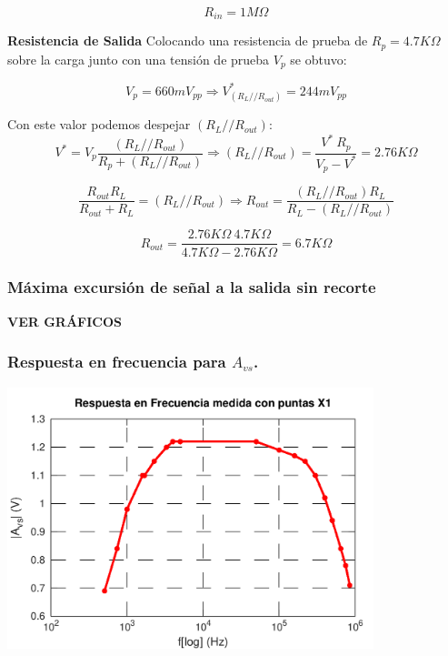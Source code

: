\documentclass[a4paper, 10pt, spanish]{article}
\begin{document}
\begin{equation}
  R_{in}=1M\Omega
\end{equation}

\textbf{Resistencia de Salida}
Colocando una resistencia de prueba de $R_p = 4.7K\Omega$ sobre la carga junto con una tensión de prueba $V_p$ se obtuvo:

\begin{equation}
  V_p= 660mV_{pp} \Rightarrow V^*_{(R_L//R_{out})} = 244 mV_{pp}
\end{equation}

Con este valor podemos despejar $(R_L//R_{out})$:
\begin{equation}
  V^*=V_p \frac{(R_L//R_{out})}{R_p + (R_L//R_{out})} \Rightarrow (R_L//R_{out}) = \frac{V^*\ R_p}{V_p-V^*} = 2.76K\Omega
\end{equation}

\begin{equation}
  \frac{R_{out}R_L}{R_{out}+R_L} = (R_L//R_{out})  \Rightarrow R_{out}=\frac{(R_L//R_{out}) R_L}{R_L - (R_L//R_{out})}
\end{equation}

\begin{equation}
  R_{out}=\frac{2.76K\Omega\ 4.7K\Omega}{4.7K\Omega - 2.76K\Omega}=6.7K\Omega
\end{equation}

\subsubsection{Máxima excursión de señal a la salida sin recorte}

\textbf{VER GRÁFICOS}

\subsubsection{Respuesta en frecuencia para $A_{vs}$.}

\begin{center}
  \includegraphics[width=0.8\textwidth]{X1.png}
  \label{fig:X1_med}
\end{center}
\end{document}
